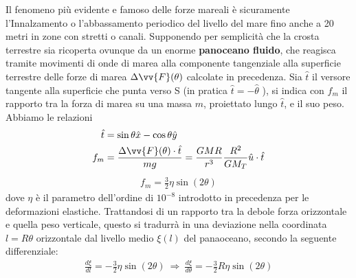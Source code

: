 \documentclass[a4paper, oneside]{book}
\begin{document}
\begin{figure}
\end{figure}
Il fenomeno più evidente e famoso delle forze mareali è sicuramente 
l'Innalzamento o l'abbassamento periodico del livello del mare 
fino anche a 20 metri in zone con stretti o canali. 
Supponendo per semplicità che la crosta terrestre sia ricoperta ovunque da un enorme 
\textbf{panoceano fluido}, che reagisca tramite movimenti di onde 
di marea alla componente tangenziale alla superficie terrestre delle forze di marea
$\Delta \vv{F}(\theta)$ calcolate in precedenza.  
Sia $\hat{t}$ il versore tangente alla superficie che punta 
verso S (in pratica $\hat{t} = - \hat{\theta}$  ), si indica con $f_m$ 
il rapporto tra la forza di marea su una massa $m$, proiettato lungo 
$\hat{t}$, e il suo peso. Abbiamo le relazioni  
\begin{align*}
    \hat{t} &= \sin\theta\hat{x} - \cos\theta\hat{y} \\
    f_m &= \frac{\Delta \vv{F}(\theta) \cdot \hat{t}  }{mg} = \frac{GMR}{r^{3}} \frac{R^{2}}{GM_T} \hat{u} \cdot \hat{t}      
\end{align*}
\begin{align}
    \boxed{f_m = \frac{3}{2}\eta \sin(2\theta)}
\end{align}
dove $\eta$ è il parametro dell'ordine di $10^{-8}$ 
introdotto in precedenza per le deformazioni elastiche. Trattandosi 
di un rapporto tra la debole forza orizzontale e quella peso 
verticale, questo si tradurrà in una deviazione nella 
coordinata $l = R\theta$ orizzontale dal livello medio $\xi(l)$ del 
panaoceano, secondo la seguente differenziale: 
\begin{gather*}
    \frac{d\xi}{dl} = -\frac{3}{2}\eta\sin(2\theta) \ \Longrightarrow \ \frac{d\xi}{d\theta} = -\frac{3}{2}R\eta\sin(2\theta)
\end{gather*}
\end{document}
